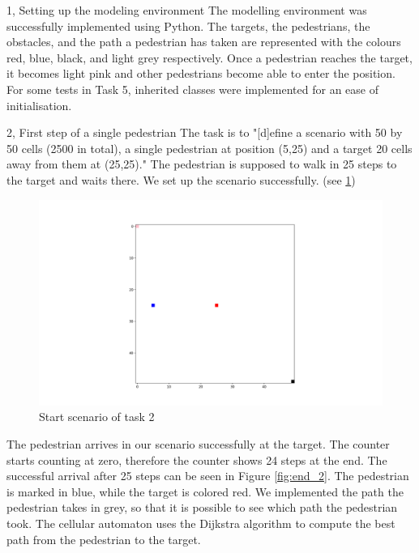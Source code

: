 \documentclass[10pt,a4paper]{article}
\begin{document}
\frontpage

\begin{task}{1, Setting up the modeling environment}
The modelling environment was successfully implemented using Python. The targets, the pedestrians, the obstacles, and the path a pedestrian has taken are represented with the colours red, blue, black, and light grey respectively. Once a pedestrian reaches the target, it becomes light pink and other pedestrians become able to enter the position. For some tests in Task 5, inherited classes were implemented for an ease of initialisation. \\
\end{task}

\begin{task}{2, First step of a single pedestrian}
The task is to "[d]efine a scenario with 50 by 50 cells (2500 in total), a single pedestrian at position (5,25) and a target 20 cells away from them at (25,25)." The pedestrian is supposed to walk in 25 steps to the target and waits there. We set up the scenario successfully. (see \ref{fig:start_2})
\begin{figure}[h!]
    \centering
    \includegraphics[width=\textwidth]{pictures/2_Start.png}
    \caption{Start scenario of task 2}
    \label{fig:start_2}
\end{figure}
\newpage
The pedestrian arrives in our scenario successfully at the target. The counter starts counting at zero, therefore the counter shows 24 steps at the end. The successful arrival after 25 steps can be seen in Figure \ref{fig:end_2}. The pedestrian is marked in blue, while the target is colored red. We implemented the path the pedestrian takes in grey, so that it is possible to see which path the pedestrian took. The cellular automaton uses the Dijkstra algorithm to compute the best path from the pedestrian to the target.

\end{task}
\end{document}
